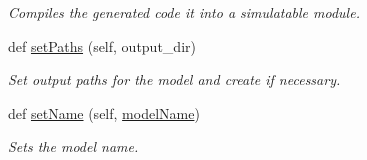 \begin{DoxyCompactItemize}
\begin{DoxyCompactList}\small\item\em Compiles the generated code it into a simulatable module. \end{DoxyCompactList}\item 
def \mbox{\hyperlink{classamici_1_1ode__export_1_1_o_d_e_exporter_a30886da9525f87826d3da2543a4aebbd}{set\+Paths}} (self, output\+\_\+dir)
\begin{DoxyCompactList}\small\item\em Set output paths for the model and create if necessary. \end{DoxyCompactList}\item 
def \mbox{\hyperlink{classamici_1_1ode__export_1_1_o_d_e_exporter_af9ec4a20beb62b41663733ecfc8e1713}{set\+Name}} (self, \mbox{\hyperlink{classamici_1_1ode__export_1_1_o_d_e_exporter_adefaf64a0bbe772b9463fa2a9cba904e}{model\+Name}})
\begin{DoxyCompactList}\small\item\em Sets the model name. \end{DoxyCompactList}\end{DoxyCompactItemize}
